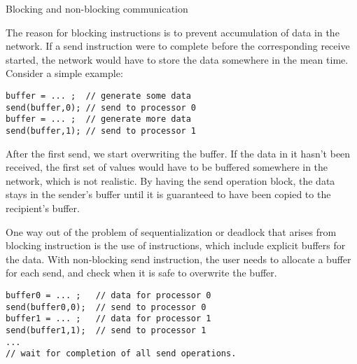  {Blocking and non-blocking communication}

The reason for blocking instructions is to prevent accumulation of
data in the network. If a send instruction were to complete before the
corresponding receive started, the network would have to store the
data somewhere in the mean time.
Consider a simple example:
\begin{verbatim}
buffer = ... ;  // generate some data
send(buffer,0); // send to processor 0
buffer = ... ;  // generate more data
send(buffer,1); // send to processor 1
\end{verbatim}
After the first send, we start overwriting the buffer. If the data in
it hasn't been received, the first set of values would have to be
buffered somewhere in the network, which is not realistic.
By having the send operation block,
the data stays in the sender's buffer until it is guaranteed to have
been copied to the recipient's buffer.

One way out of the problem of sequentialization or deadlock that
arises from blocking instruction is the use
of  instructions, which include
explicit buffers for the data. With non-blocking send instruction, the
user needs to allocate a buffer for each send, and check when it is
safe to overwrite the buffer.
\begin{verbatim}
buffer0 = ... ;   // data for processor 0
send(buffer0,0);  // send to processor 0
buffer1 = ... ;   // data for processor 1
send(buffer1,1);  // send to processor 1
...
// wait for completion of all send operations.
\end{verbatim}

